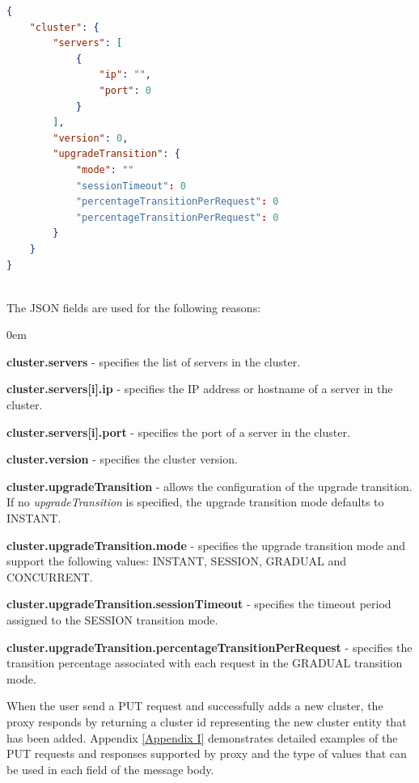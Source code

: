 \documentclass[a4paper,11pt,twoside]{article}
\begin{document}
\begin{lstlisting}[language=json,firstnumber=1]
{
    "cluster": {
        "servers": [
            {
                "ip": "", 
                "port": 0
            }
        ], 
        "version": 0, 
        "upgradeTransition": {
            "mode": ""
            "sessionTimeout": 0  
            "percentageTransitionPerRequest": 0
            "percentageTransitionPerRequest": 0  
        }
    }
}
\end{lstlisting}

\noindent\\
The JSON fields are used for the following reasons:

\begin{list}{-}{}
  \itemsep0em
  \item\textbf{{cluster.servers}} - specifies the list of servers in the cluster.
  
  \item\textbf{{cluster.servers[i].ip}} - specifies the IP address or hostname of a server in the cluster.
  
  \item\textbf{{cluster.servers[i].port}} - specifies the port of a server in the cluster.
  
  \item\textbf{{cluster.version}} - specifies the cluster version. 
  
  \item\textbf{{cluster.upgradeTransition}} - allows the configuration of the upgrade transition. If no \textit{upgradeTransition} is specified, the upgrade transition mode defaults to INSTANT.  
  
  \item\textbf{{cluster.upgradeTransition.mode}} - specifies the upgrade transition mode and support the following values: INSTANT, SESSION, GRADUAL and CONCURRENT.
   
  \item\textbf{{cluster.upgradeTransition.sessionTimeout}} - specifies the timeout period assigned to the SESSION transition mode.
  
  \item\textbf{{cluster.upgradeTransition.percentageTransitionPerRequest}} - specifies the transition percentage associated with each request in the GRADUAL transition mode.
\end{list}

\noindent
When the user send a PUT request and successfully adds a new cluster, the proxy responds by returning a cluster id representing the new cluster entity that has been added. Appendix \ref{Appendix  I} demonstrates detailed examples of the PUT requests and responses supported by proxy and the type of values that can be used in each field of the message body.
\end{document}
